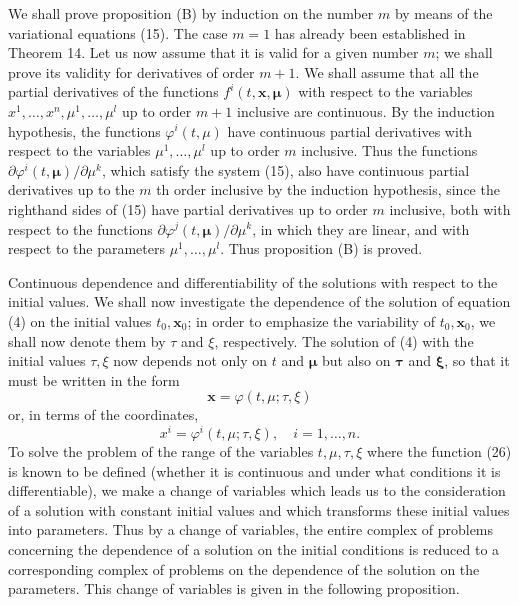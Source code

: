 \documentclass[10pt,a5paper]{book}
\makeatletter
\theoremstyle{plain}
\theoremstyle{definition}
\theoremstyle{remark}
\renewenvironment{proof}[1][\proofname]{\par
  \pushQED{\qed}%
  \normalfont\topsep6\p@\@plus6\p@\relax
  \trivlist
  \item\relax{\itshape #1\@addpunct{.}}\hspace\labelsep\ignorespaces
}{\popQED\endtrivlist\@endpefalse}
\makeatother
\begin{document}
\begin{proof}
We shall prove proposition (B) by induction on the number $m$ by means of the variational equations (15). The case $m=1$ has already been established in Theorem 14. Let us now assume that it is valid for a given number $m$; we shall prove its validity for derivatives of order $m+1$. We shall assume that all the partial derivatives of the functions $f^{i}(t, \mathbf{x}, \boldsymbol{\mu})$ with respect to the variables $x^{1}, \ldots, x^{n}, \mu^{1}, \ldots, \mu^{l}$ up to order $m+1$ inclusive are continuous. By the induction hypothesis, the functions $\varphi^{i}(t, \mu)$ have continuous partial derivatives with respect to the variables $\mu^{1}, \ldots, \mu^{l}$ up to order $m$ inclusive. Thus the functions $\partial \varphi^{i}(t, \boldsymbol{\mu}) / \partial \mu^{k}$, which satisfy the system (15), also have continuous partial derivatives up to the $m$ th order inclusive by the induction hypothesis, since the righthand sides of (15) have partial derivatives up to order $m$ inclusive, both with respect to the functions $\partial \varphi^{j}(t, \boldsymbol{\mu}) / \partial \mu^{k}$, in which they are linear, and with respect to the parameters $\mu^{1}, \ldots, \mu^{l}$. Thus proposition (B) is proved.

Continuous dependence and differentiability of the solutions with respect to the initial values. We shall now investigate the dependence of the solution of equation (4) on the initial values $t_{0}, \mathbf{x}_{0}$; in order to emphasize the variability of $t_{0}, \mathbf{x}_{0}$, we shall now denote them by $\tau$ and $\xi$, respectively. The solution of (4) with the initial values $\tau, \xi$ now depends not only on $t$ and $\boldsymbol{\mu}$ but also on $\boldsymbol{\tau}$ and $\boldsymbol{\xi}$, so that it must be written in the form
\begin{equation*}
\mathbf{x}=\varphi(t, \mu ; \tau, \xi) \tag{26}
\end{equation*}
or, in terms of the coordinates,
\[
x^{i}=\varphi^{i}(t, \mu ; \tau, \xi), \quad i=1, \ldots, n .
\]
To solve the problem of the range of the variables $t, \mu, \tau, \xi$ where the function (26) is known to be defined (whether it is continuous and under what conditions it is differentiable), we make a change of variables which leads us to the consideration of a solution with constant initial values and which transforms these initial values into parameters. Thus by a change of variables, the entire complex of problems concerning the dependence of a solution on the initial conditions is reduced to a corresponding complex of problems on the dependence of the solution on the parameters. This change of variables is given in the following proposition.


\end{proof}
\end{document}
